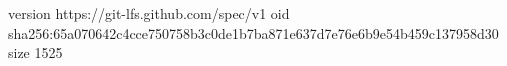 version https://git-lfs.github.com/spec/v1
oid sha256:65a070642c4cce750758b3c0de1b7ba871e637d7e76e6b9e54b459c137958d30
size 1525
